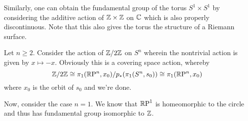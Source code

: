 \begin{remark}
    Similarly, one can obtain the fundamental group of the torus $S^1\times S^1$ by considering the additive action of $\mathbb{Z}\times\mathbb{Z}$ on $\mathbb{C}$ which is also properly discontinuous. Note that this also gives the torus the structure of a Riemann surface.
\end{remark}

\begin{example}
    Let $n\ge 2$. Consider the action of $\mathbb{Z}/2\mathbb{Z}$ on $S^n$ wherein the nontrivial action is given by $x\mapsto -x$. Obviously this is a covering space action, whereby 
    \begin{equation*}
        \mathbb{Z}/2\mathbb{Z}\cong\pi_1(\mathbb{R}\text{P}^n, x_0)/p_\ast(\pi_1(S^n, s_0))\cong\pi_1(\mathbb{R}\text{P}^n, x_0)
    \end{equation*}
    where $x_0$ is the orbit of $s_0$ and we're done.

    Now, consider the case $n = 1$. We know that $\mathbb{R}\text{P}^1$ is homeomorphic to the circle and thus has fundamental group isomorphic to $\mathbb{Z}$.
\end{example}
